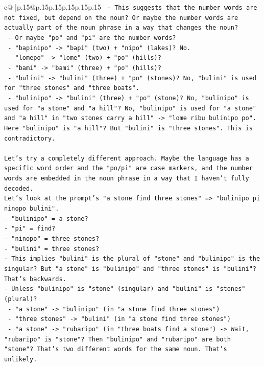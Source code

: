\documentclass{article}
\begin{document}
{\begin{supertabular}{c@{$\;$}|p{.15\linewidth}@{}p{.15\linewidth}p{.15\linewidth}p{.15\linewidth}p{.15\linewidth}p{.15\linewidth}}
{{{\texttt{    {-} This suggests that the number words are not fixed, but depend on the noun? Or maybe the number words are actually part of the noun phrase in a way that changes the noun?} \\
\texttt{    {-} Or maybe "po" and "pi" are the number words?} \\
\texttt{      {-} "bapinipo" {-}> "bapi" (two) + "nipo" (lakes)? No.} \\
\texttt{      {-} "lomepo" {-}> "lome" (two) + "po" (hills)?} \\
\texttt{      {-} "bami" {-}> "bami" (three) + "po" (hills)?} \\
\texttt{      {-} "bulini" {-}> "bulini" (three) + "po" (stones)? No, "bulini" is used for "three stones" and "three boats".} \\
\texttt{      {-} "bulinipo" {-}> "bulini" (three) + "po" (stone)? No, "bulinipo" is used for "a stone" and "a hill"? No, "bulinipo" is used for "a stone" and "a hill" in "two stones carry a hill" {-}> "lome ribu bulinipo po". Here "bulinipo" is "a hill"? But "bulini" is "three stones". This is contradictory.} \\
\\ 
\texttt{Let's try a completely different approach. Maybe the language has a specific word order and the "po/pi" are case markers, and the number words are embedded in the noun phrase in a way that I haven't fully decoded.} \\
\texttt{Let's look at the prompt's "a stone find three stones" => "bulinipo pi ninopo bulini".} \\
\texttt{{-} "bulinipo" = a stone?} \\
\texttt{{-} "pi" = find?} \\
\texttt{{-} "ninopo" = three stones?} \\
\texttt{{-} "bulini" = three stones?} \\
\texttt{{-} This implies "bulini" is the plural of "stone" and "bulinipo" is the singular? But "a stone" is "bulinipo" and "three stones" is "bulini"? That's backwards.} \\
\texttt{{-} Unless "bulinipo" is "stone" (singular) and "bulini" is "stones" (plural)?} \\
\texttt{  {-} "a stone" {-}> "bulinipo" (in "a stone find three stones")} \\
\texttt{  {-} "three stones" {-}> "bulini" (in "a stone find three stones")} \\
\texttt{  {-} "a stone" {-}> "rubaripo" (in "three boats find a stone") {-}> Wait, "rubaripo" is "stone"? Then "bulinipo" and "rubaripo" are both "stone"? That's two different words for the same noun. That's unlikely.} \\
}}}
\end{supertabular}}
\end{document}
